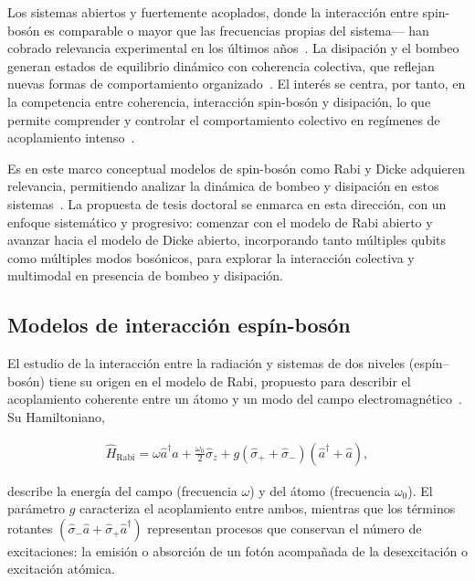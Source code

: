 \documentclass[onecolumn,notitlepage,letterpaper,aps,pra,12pt]{article}
\numberwithin{equation}{section}
\begin{document}
Los sistemas abiertos y fuertemente acoplados, donde la interacción entre spin-bosón es comparable o mayor que las frecuencias propias del sistema— han cobrado relevancia experimental en los últimos años~\cite{Grifoni1999,ZhangHou2015,Burger2022,Fazio2025}. La disipación y el bombeo generan estados de equilibrio dinámico con coherencia colectiva, que reflejan nuevas formas de comportamiento organizado~\cite{Sieberer2016,Halati2020,Chelpanova2025}. El interés se centra, por tanto, en la competencia entre coherencia, interacción spin-bosón y disipación, lo que permite comprender y controlar el comportamiento colectivo en regímenes de acoplamiento intenso~\cite{subasi2012,FornDiaz2019,Kirton2018,LeBoite2020,roses2020}.

Es en este marco conceptual modelos de spin-bosón como Rabi y Dicke adquieren relevancia, permitiendo analizar la dinámica de bombeo y disipación en estos sistemas~\cite{henriet2014,hwang2018,DiBello2024-2,Nagy10,Klinder15}. La propuesta de tesis doctoral se enmarca en esta dirección, con un enfoque sistemático y progresivo: comenzar con el modelo de Rabi abierto y avanzar hacia el modelo de Dicke abierto, incorporando tanto múltiples qubits como múltiples modos bosó\-nicos, para explorar la interacción colectiva y multimodal en presencia de bombeo y disipación.


\subsection{Modelos de interacción espín-bosón}

El estudio de la interacción entre la radiación y sistemas de dos niveles (espín–bosón) tiene su origen en el modelo de Rabi, propuesto para describir el acoplamiento coherente entre un átomo y un modo del campo electromagnético~\cite{rabi1936}. Su Hamiltoniano,

\begin{gather}\label{Hamiltoniano de Rabi}
    \hat{H}_{\text{Rabi}} = \omega\hat{a}^{\dagger}\hat{a} + \frac{\omega_{0}}{2}\hat{\sigma}_{z} + g\left( \hat{\sigma}_{+} + \hat{\sigma}_{-} \right)\left( \hat{a}^{\dagger} + \hat{a} \right),
\end{gather}

describe la energía del campo (frecuencia $\omega$) y del átomo (frecuencia $\omega_{0}$). El parámetro $g$ caracteriza el acoplamiento entre ambos, mientras que los términos rotantes $(\hat{\sigma}_{-}\hat{a} + \hat{\sigma}_{+}\hat{a}^{\dagger})$ representan procesos que conservan el número de excitaciones: la emisión o absorción de un fotón acompañada de la desexcitación o excitación atómica.
\end{document}
